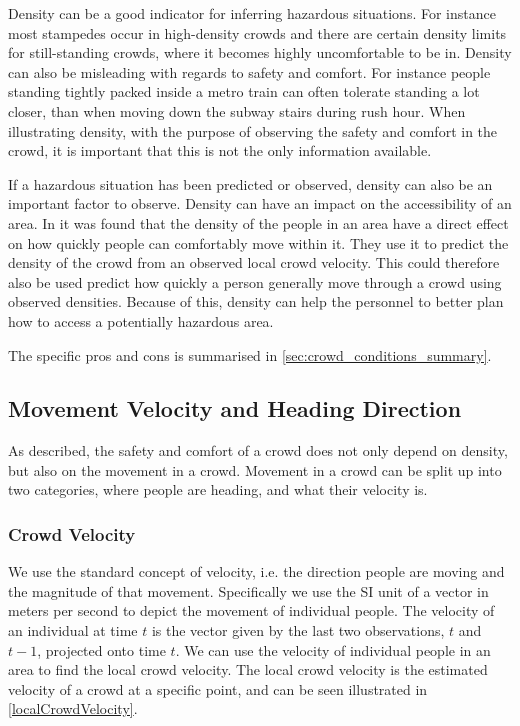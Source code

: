 Density can be a good indicator for inferring hazardous situations. For instance most stampedes occur in high-density crowds\cite{wirz2012inferring} and there are certain density limits for still-standing crowds, where it becomes highly uncomfortable to be in. 
Density can also be misleading with regards to safety and comfort. For instance people standing tightly packed inside a metro train can often tolerate standing a lot closer, than when moving down the subway stairs during rush hour. When illustrating density, with the purpose of observing the safety and comfort in the crowd, it is important that this is not the only information available.

If a hazardous situation has been predicted or observed, density can also be an important factor to observe. Density can have an impact on the accessibility of an area. In \citet{wirz2013probing} it was found that the density of the people in an area have a direct effect on how quickly people can comfortably move within it. They use it to predict the density of the crowd from an observed local crowd velocity. This could therefore also be used predict how quickly a person generally move through a crowd using observed densities. Because of this, density can help the personnel to better plan how to access a potentially hazardous area.

The specific pros and cons is summarised in \cref{sec:crowd_conditions_summary}.

\subsection{Movement Velocity and Heading Direction}
As described, the safety and comfort of a crowd does not only depend on density, but also on the movement in a crowd. Movement in a crowd can be split up into two categories, where people are heading, and what their velocity is.

\subsubsection{Crowd Velocity}
We use the standard concept of velocity, i.e. the direction people are moving and the magnitude of that movement. Specifically we use the SI unit of a vector in meters per second to depict the movement of individual people. The velocity of an individual at time $t$ is the vector given by the last two observations, $t$ and $t-1$, projected onto time $t$. We can use the velocity of individual people in an area to find the local crowd velocity. The local crowd velocity is the estimated velocity of a crowd at a specific point, and can be seen illustrated in \cref{localCrowdVelocity}.

